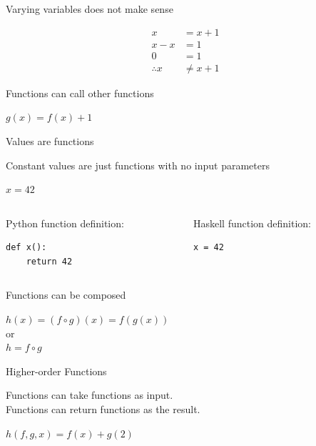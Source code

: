 \documentclass[mathserif]{beamer}
\begin{document}
\begin{frame}{Varying variables does not make sense}

  {\Huge
    \begin{align*}
           x     & = x + 1\\
           x - x & = 1\\
           0     & = 1\\
\therefore x     & \neq x + 1
    \end{align*}
  }

\end{frame}

\begin{frame}{Functions can call other functions}

  {\Huge $g(x) = f(x) + 1$}

\end{frame}

\begin{frame}[fragile]{Values are functions}

  {\large Constant values are just functions with no input parameters}

  \vskip5mm
  {\Huge $x = 42$}
  \vskip10mm

  \begin{columns}[t]
    \begin{column}[T]{5cm}
      Python function definition:
      \begin{verbatim}
def x():
    return 42
      \end{verbatim}
    \end{column}

    \begin{column}[T]{5cm}
       Haskell function definition:
       \begin{verbatim}
x = 42
       \end{verbatim}
    \end{column}
  \end{columns}
\end{frame}

\begin{frame}{Functions can be composed}

  {\Huge $h(x) = (f \circ g)(x) = f(g(x))$\\
  \vskip5mm
  or\\
  \vskip5mm
  $h = f \circ g$}

\end{frame}

\begin{frame}{Higher-order Functions}

  {\Large Functions can take functions as input.}\\
  {\Large Functions can return functions as the result.}

  \vskip5mm

  {\Huge $h(f, g, x) = f(x) + g(2)$}

\end{frame}
\end{document}
